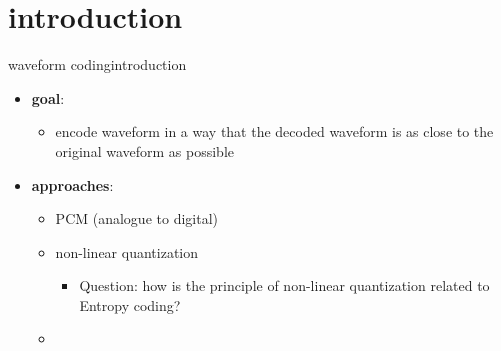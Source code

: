 



\subtitle{Part 25: Waveform Coding}


	

\section[intro]{introduction}

	\begin{frame}{waveform coding}{introduction}
        \begin{itemize}
            \item   \textbf{goal}: 
                \begin{itemize}
                    \item   encode waveform in a way that the decoded waveform is as close to the original waveform as possible
                \end{itemize}
            \pause
            \bigskip
            \item   \textbf{approaches}:
                \begin{itemize}
                    \item   PCM (analogue to digital)
                    \pause
                    \item   non-linear quantization 
                    \pause
                        \begin{itemize}
                            \item   Question: how is the principle of non-linear quantization related to Entropy coding?
                        \end{itemize}
                    \pause
                    \item   {}
                \end{itemize}
        \end{itemize}
	\end{frame}
